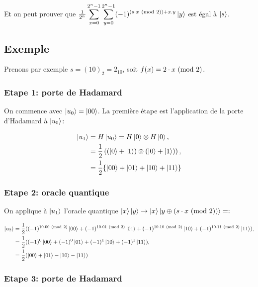 Et on peut prouver que $\frac{1}{2^{n}} \displaystyle\sum_{x=0}^{2^n-1} \displaystyle\sum_{y=0}^{2^n-1} (-1)^{(s \cdot x \ (\mathrm{mod}\ 2)) + x.y} \ket{y}$ est égal à $\ket{s}$.

\subsection{Exemple}

Prenons par exemple $s=(10)_2 = 2_{10}$, soit $f(x) = 2 \cdot x \ (\mathrm{mod}\ 2)$.
\subsubsection*{Etape 1: porte de Hadamard}

On commence avec $\ket{u_0} = \ket{00}$. La première étape est
l'application de la porte d'Hadamard à $\ket{u_0}$:

\begin{align}
\ket{u_1} &= H\ket{u_0} = H\ket{0} \otimes H\ket{0} \nonumber ,\\
& = \frac{1}{2} \left( (\ket{0} + \ket{1})\otimes(\ket{0} + \ket{1}) \right) \nonumber ,\\
 & = \frac{1}{2}\{\ket{00} + \ket{01} + \ket{10} + \ket{11}\}
\end{align}


\subsubsection*{Etape 2: oracle quantique}

On applique à $\ket{u_1}$ l'oracle quantique $\ket{x}\ket{y}\rightarrow\ket{x}\ket{y\oplus (s \cdot x \ (\mathrm{mod}\ 2))} = :$

\begin{align}
  \ket{u_2} &= \frac{1}{2}((-1)^{10 \cdot 00 \ (\mathrm{mod}\ 2)} \ket{00} + (-1)^{10 \cdot 01 \ (\mathrm{mod}\ 2)} \ket{01} + (-1)^{10 \cdot 10 \ (\mathrm{mod}\ 2)} \ket{10} + (-1)^{10 \cdot 11 \ (\mathrm{mod}\ 2)} \ket{11}) \nonumber ,\\
  &= \frac{1}{2}((-1)^{0} \ket{00} + (-1)^{0} \ket{01} + (-1)^{1} \ket{10} + (-1)^{1} \ket{11}) \nonumber ,\\
  &= \frac{1}{2} (\ket{00} + \ket{01} - \ket{10} - \ket{11})
\end{align}

\subsubsection*{Etape 3: porte de Hadamard}

